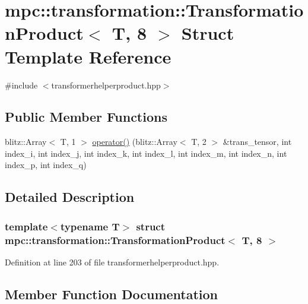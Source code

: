 \hypertarget{structmpc_1_1transformation_1_1_transformation_product_3_01_t_00_018_01_4}{}\section{mpc\+:\+:transformation\+:\+:Transformation\+Product$<$ T, 8 $>$ Struct Template Reference}
\label{structmpc_1_1transformation_1_1_transformation_product_3_01_t_00_018_01_4}


{\ttfamily \#include $<$transformerhelperproduct.\+hpp$>$}

\subsection*{Public Member Functions}
\begin{DoxyCompactItemize}
\item 
blitz\+::\+Array$<$ T, 1 $>$ \mbox{\hyperlink{structmpc_1_1transformation_1_1_transformation_product_3_01_t_00_018_01_4_a249f5845319c4f258f091d1c3488e365}{operator()}} (blitz\+::\+Array$<$ T, 2 $>$ \&trans\+\_\+tensor, int index\+\_\+i, int index\+\_\+j, int index\+\_\+k, int index\+\_\+l, int index\+\_\+m, int index\+\_\+n, int index\+\_\+p, int index\+\_\+q)
\end{DoxyCompactItemize}


\subsection{Detailed Description}
\subsubsection*{template$<$typename T$>$\newline
struct mpc\+::transformation\+::\+Transformation\+Product$<$ T, 8 $>$}



Definition at line 203 of file transformerhelperproduct.\+hpp.



\subsection{Member Function Documentation}
\mbox{\label{structmpc_1_1transformation_1_1_transformation_product_3_01_t_00_018_01_4_a249f5845319c4f258f091d1c3488e365}} 
